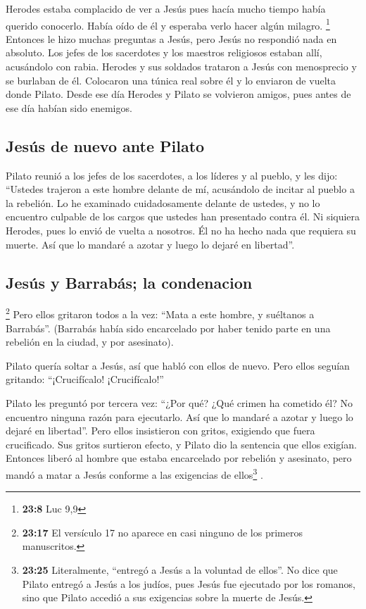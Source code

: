  Herodes estaba complacido de ver a Jesús pues hacía mucho
tiempo había querido conocerlo. Había oído de él y esperaba verlo hacer
algún milagro. \footnote{\textbf{23:8} Luc 9,9}  Entonces
le hizo muchas preguntas a Jesús, pero Jesús no respondió nada en
absoluto.  Los jefes de los sacerdotes y los maestros
religiosos estaban allí, acusándolo con rabia.  Herodes y
sus soldados trataron a Jesús con menosprecio y se burlaban de él.
Colocaron una túnica real sobre él y lo enviaron de vuelta donde Pilato.
 Desde ese día Herodes y Pilato se volvieron amigos, pues
antes de ese día habían sido enemigos.

\hypertarget{jesuxfas-de-nuevo-ante-pilato}{%
\subsection{Jesús de nuevo ante
Pilato}\label{jesuxfas-de-nuevo-ante-pilato}}

 Pilato reunió a los jefes de los sacerdotes, a los
líderes y al pueblo,  y les dijo: ``Ustedes trajeron a
este hombre delante de mí, acusándolo de incitar al pueblo a la
rebelión. Lo he examinado cuidadosamente delante de ustedes, y no lo
encuentro culpable de los cargos que ustedes han presentado contra él.
 Ni siquiera Herodes, pues lo envió de vuelta a nosotros.
Él no ha hecho nada que requiera su muerte.  Así que lo
mandaré a azotar y luego lo dejaré en libertad''.

\hypertarget{jesuxfas-y-barrabuxe1s-la-condenacion}{%
\subsection{Jesús y Barrabás; la
condenacion}\label{jesuxfas-y-barrabuxe1s-la-condenacion}}

 \footnote{\textbf{23:17} El versículo 17 no aparece en
  casi ninguno de los primeros manuscritos.}  Pero ellos
gritaron todos a la vez: ``Mata a este hombre, y suéltanos a Barrabás''.
 (Barrabás había sido encarcelado por haber tenido parte
en una rebelión en la ciudad, y por asesinato).

 Pilato quería soltar a Jesús, así que habló con ellos de
nuevo.  Pero ellos seguían gritando: ``¡Crucifícalo!
¡Crucifícalo!''

 Pilato les preguntó por tercera vez: ``¿Por qué? ¿Qué
crimen ha cometido él? No encuentro ninguna razón para ejecutarlo. Así
que lo mandaré a azotar y luego lo dejaré en libertad''. 
Pero ellos insistieron con gritos, exigiendo que fuera crucificado. Sus
gritos surtieron efecto,  y Pilato dio la sentencia que
ellos exigían.  Entonces liberó al hombre que estaba
encarcelado por rebelión y asesinato, pero mandó a matar a Jesús
conforme a las exigencias de ellos\footnote{\textbf{23:25} Literalmente,
  ``entregó a Jesús a la voluntad de ellos''. No dice que Pilato entregó
  a Jesús a los judíos, pues Jesús fue ejecutado por los romanos, sino
  que Pilato accedió a sus exigencias sobre la muerte de Jesús.} .

